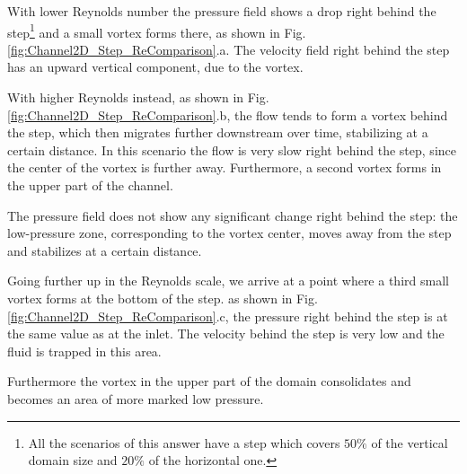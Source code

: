 \documentclass[11pt,a4paper,DIV12,pdftex]{scrartcl}
\begin{document}
\begin{enumerate}
	With lower Reynolds number the pressure field shows a drop right behind the step\footnote{All the scenarios of this answer have a step which covers $50\%$ of the vertical domain size and $20\%$ of the horizontal one.} and a small vortex forms there, as shown in Fig.\ref{fig:Channel2D_Step_ReComparison}.a. The velocity field right behind the step has an upward vertical component, due to the vortex.

	With higher Reynolds instead, as shown in Fig.\ref{fig:Channel2D_Step_ReComparison}.b, the flow tends to form a vortex behind the step, which then migrates further downstream over time, stabilizing at a certain distance. In this scenario the flow is very slow right behind the step, since the center of the vortex is further away. Furthermore, a second vortex forms in the upper part of the channel.

	The pressure field does not show any significant change right behind the step: the low-pressure zone, corresponding to the vortex center, moves away from the step and stabilizes at a certain distance.

	Going further up in the Reynolds scale, we arrive at a point where a third small vortex forms at the bottom of the step. as shown in Fig.\ref{fig:Channel2D_Step_ReComparison}.c, the pressure right behind the step is at the same value as at the inlet. The velocity behind the step is very low and the fluid is trapped in this area.

	Furthermore the vortex in the upper part of the domain consolidates and becomes an area of more marked low pressure.


\end{enumerate}
\end{document}
